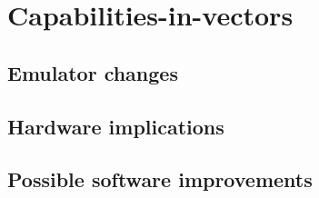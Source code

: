 \chapter{Capabilities-in-vectors}

\section{Emulator changes}

\section{Hardware implications}

\section{Possible software improvements}


